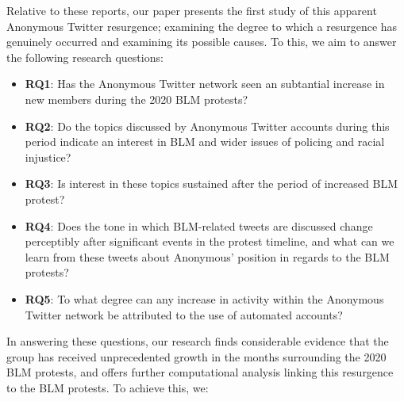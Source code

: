 \documentclass[letterpaper]{article}
\begin{document}
Relative to these reports, our paper presents the first study of this apparent Anonymous Twitter resurgence; examining the degree to which a resurgence has genuinely occurred and examining its possible causes. To this, we aim to answer the following research questions:

\begin{itemize}
\item \textbf{RQ1}: Has the Anonymous Twitter network seen an subtantial increase in new members during the 2020 BLM protests?

\item \textbf{RQ2}: Do the topics discussed by Anonymous Twitter accounts during this period indicate an interest in BLM and wider issues of policing and racial injustice?

\item \textbf{RQ3}: Is interest in these topics sustained after the period of increased BLM protest?

\item \textbf{RQ4}: Does the tone in which BLM-related tweets are discussed change perceptibly after significant events in the protest timeline, and what can we learn from these tweets about Anonymous' position in regards to the BLM protests?

\item \textbf{RQ5}: To what degree can any increase in activity within the Anonymous Twitter network be attributed to the use of automated accounts?
\end{itemize}

In answering these questions, our research finds considerable evidence that the group has received unprecedented growth in the months surrounding the 2020 BLM protests, and offers further computational analysis linking this resurgence to the BLM protests. To achieve this, we:
\end{document}
